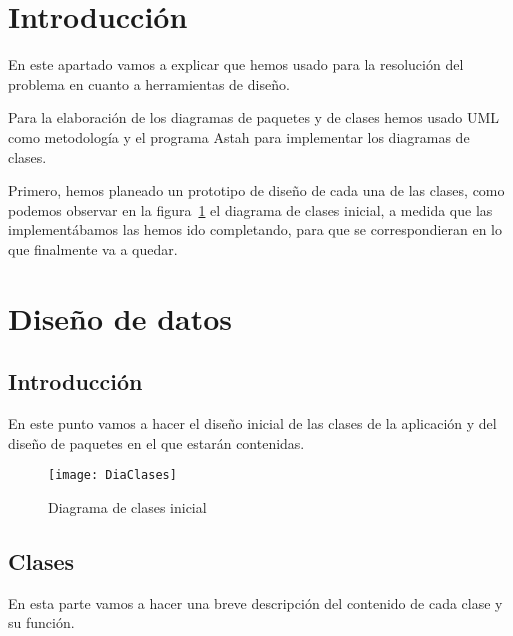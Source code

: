 
\section{Introducción}

En este apartado vamos a explicar que hemos usado para la resolución del problema en cuanto a herramientas de diseño.

Para la elaboración de los diagramas de paquetes y de clases hemos usado UML como metodología y el programa Astah para implementar los diagramas de clases.

Primero, hemos planeado un prototipo de diseño de cada una de las clases, como podemos observar en la figura~\ref{fig:C.1.1} el diagrama de clases inicial, a medida que las implementábamos las hemos ido completando, para que se correspondieran en lo que finalmente va a quedar.



\section{Diseño de datos}

\subsection{Introducción}
En este punto vamos a hacer el diseño inicial de las clases de la aplicación y del diseño de paquetes en el que estarán contenidas.

\begin{figure}[h]
	\centering
	\texttt{[image: DiaClases]}
	\caption{Diagrama de clases inicial}
	\label{fig:C.1.1}
\end{figure}
 


\subsection{Clases}
En esta parte vamos a hacer una breve descripción del contenido de cada clase y su función.

